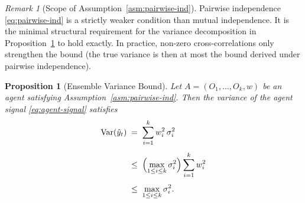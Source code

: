 \documentclass[12pt,openany]{book}
\numberwithin{equation}{chapter}
\theoremstyle{plain}
\newtheorem{proposition}[theorem]{Proposition}
\theoremstyle{definition}
\theoremstyle{remark}
\newtheorem{remark}[theorem]{Remark}
\numberwithin{equation}{chapter}
\theoremstyle{plain}
\DeclareMathOperator{\Var}{Var}
\begin{document}
\begin{remark}[Scope of Assumption~\ref{asm:pairwise-ind}]
\label{rem:ind-scope}
Pairwise independence \eqref{eq:pairwise-ind} is a strictly weaker
condition than mutual independence.  It is the minimal structural
requirement for the variance decomposition in
Proposition~\ref{prop:ensemble-var} to hold exactly.  In practice,
non-zero cross-correlations only strengthen the bound (the true variance
is then at most the bound derived under pairwise independence).
\end{remark}

\begin{proposition}[Ensemble Variance Bound]
\label{prop:ensemble-var}
Let $A = (O_1,\ldots,O_k,w)$ be an agent satisfying
Assumption~\ref{asm:pairwise-ind}.  Then the variance of the agent
signal \eqref{eq:agent-signal} satisfies
\begin{align}
  \Var(\hat{y}_t)
    &\;=\;   \sum_{i=1}^{k} w_i^2\,\sigma_i^2
    \label{eq:var-exact}\\[4pt]
    &\;\leq\; \Bigl(\max_{1 \leq i \leq k}\sigma_i^2\Bigr)
              \sum_{i=1}^{k} w_i^2
    \label{eq:var-step2}\\[4pt]
    &\;\leq\; \max_{1 \leq i \leq k}\sigma_i^2.
    \label{eq:var-bound}
\end{align}
\end{proposition}
\end{document}
